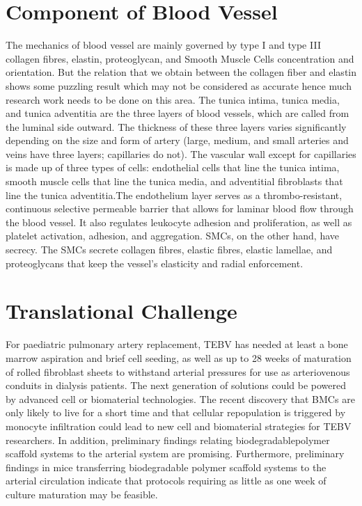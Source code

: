 \documentclass[12pt,letterpaper]{article}
\begin{document}
\begin{Summary}
\section{Component of Blood Vessel}
The mechanics of blood vessel are mainly governed by type I and type III collagen fibres,
elastin, proteoglycan, and Smooth Muscle Cells concentration and orientation. But the relation
that we obtain between the collagen fiber and elastin shows some puzzling result which may not
be considered as accurate hence much research work needs to be done on this area.
The tunica intima, tunica media, and tunica adventitia are the three layers of blood vessels,
which are called from the luminal side outward. The thickness of these three layers varies
significantly depending on the size and form of artery (large, medium, and small arteries and
veins have three layers; capillaries do not).
The vascular wall except for capillaries is made up of three types of cells: endothelial cells that
line the tunica intima, smooth muscle cells that line the tunica media, and adventitial fibroblasts
that line the tunica adventitia.The endothelium layer serves as a thrombo-resistant, continuous
selective permeable barrier that allows for laminar blood flow through the blood vessel. It also
regulates leukocyte adhesion and proliferation, as well as platelet activation, adhesion, and
aggregation. SMCs, on the other hand, have secrecy. The SMCs secrete collagen fibres, elastic
fibres, elastic lamellae, and proteoglycans that keep the vessel's elasticity and radial
enforcement.

\section{Translational Challenge}
For paediatric pulmonary artery replacement, TEBV has needed at least a bone marrow
aspiration and brief cell seeding, as well as up to 28 weeks of maturation of rolled fibroblast
sheets to withstand arterial pressures for use as arteriovenous conduits in dialysis patients. The
next generation of solutions could be powered by advanced cell or biomaterial technologies.
The recent discovery that BMCs are only likely to live for a short time and that cellular
repopulation is triggered by monocyte infiltration could lead to new cell and biomaterial
strategies for TEBV researchers. In addition, preliminary findings relating biodegradablepolymer scaffold systems to the arterial system are promising. Furthermore, preliminary findings
in mice transferring biodegradable polymer scaffold systems to the arterial circulation indicate
that protocols requiring as little as one week of culture maturation may be feasible.



\end{Summary}
\end{document}
